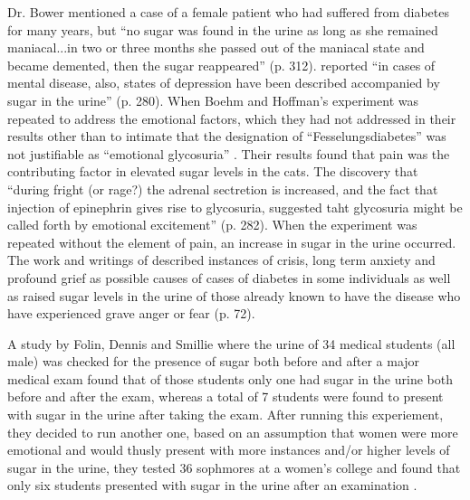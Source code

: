\documentclass[12pt]{article}
\begin{document}
Dr. Bower  \citep{bond_1896_relation} mentioned a case of a female patient who had suffered from diabetes for many years, but ``no sugar was found in the urine as long as she remained maniacal...in two or three months she passed out of the maniacal state and became demented, then the sugar reappeared'' (p. 312). 
\citet{Cannon_emotional_1911} reported ``in cases of mental disease, also, states of depression have been described accompanied by sugar in the urine'' (p. 280). 
When Boehm and Hoffman's experiment was repeated to address the emotional factors, which they had not addressed in their results other than to intimate that the designation of ``Fesselungsdiabetes'' was not justifiable as ``emotional glycosuria'' \citep[p.281] {cannon_1916_bodily}. Their results found that pain was the contributing factor in elevated sugar levels in the cats. The discovery that ``during fright (or rage?) the adrenal sectretion is increased, and the fact that injection of epinephrin gives rise to glycosuria, suggested taht glycosuria might be called forth by emotional excitement'' (p. 282). When the experiment was repeated without the element of pain, an increase in sugar in the urine occurred. 
The work and writings of \citet{naunyn_diabetes_1898} described instances of crisis, long term anxiety and profound grief as possible causes of cases of diabetes in some individuals as well as raised sugar levels in the urine of those already known to have the disease who have experienced grave anger or fear (p. 72). 

A study by Folin, Dennis and Smillie where the urine of 34 medical students (all male) was checked for the presence of sugar both before and after a major medical exam found that of those students only one had sugar in the urine both before and after the exam, whereas a total of 7 students were found to present with sugar in the urine after taking the exam.
After running this experiement, they decided to run another one, based on an assumption that women were more emotional and would thusly present with more instances and/or higher levels of sugar in the urine, they tested 36 sophmores at a women's college and found that only six students presented with sugar in the urine after an examination \citep [p. 343] {bowman_sugar_1929}. 
\end{document}

